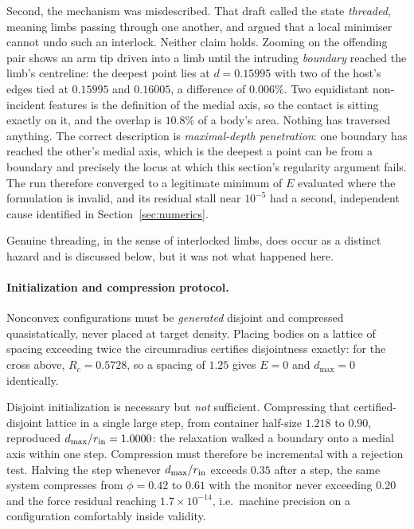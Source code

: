 \documentclass[11pt]{article}
\begin{document}
Second, the mechanism was misdescribed. That draft called the state \emph{threaded}, meaning limbs passing through one another, and argued that a local minimiser cannot undo such an interlock. Neither claim holds. Zooming on the offending pair shows an arm tip driven into a limb until the intruding \emph{boundary} reached the limb's centreline: the deepest point lies at $d = 0.15995$ with two of the host's edges tied at $0.15995$ and $0.16005$, a difference of $0.006\%$. Two equidistant non-incident features is the definition of the medial axis, so the contact is sitting exactly on it, and the overlap is $10.8\%$ of a body's area. Nothing has traversed anything. The correct description is \emph{maximal-depth penetration}: one boundary has reached the other's medial axis, which is the deepest a point can be from a boundary and precisely the locus at which this section's regularity argument fails. The run therefore converged to a legitimate minimum of $E$ evaluated where the formulation is invalid, and its residual stall near $10^{-5}$ had a second, independent cause identified in Section~\ref{sec:numerics}.

Genuine threading, in the sense of interlocked limbs, does occur as a distinct hazard and is discussed below, but it was not what happened here.

\paragraph{Initialization and compression protocol.} Nonconvex configurations must be \emph{generated} disjoint and compressed quasistatically, never placed at target density. Placing bodies on a lattice of spacing exceeding twice the circumradius certifies disjointness exactly: for the cross above, $R_c = 0.5728$, so a spacing of $1.25$ gives $E = 0$ and $d_{\max} = 0$ identically.

Disjoint initialization is necessary but \emph{not} sufficient. Compressing that certified-disjoint lattice in a single large step, from container half-size $1.218$ to $0.90$, reproduced $d_{\max}/r_{\rm in} = 1.0000$: the relaxation walked a boundary onto a medial axis within one step. Compression must therefore be incremental with a rejection test. Halving the step whenever $d_{\max}/r_{\rm in}$ exceeds $0.35$ after a step, the same system compresses from $\phi = 0.42$ to $0.61$ with the monitor never exceeding $0.20$ and the force residual reaching $1.7\times10^{-14}$, i.e.\ machine precision on a configuration comfortably inside validity.
\end{document}
